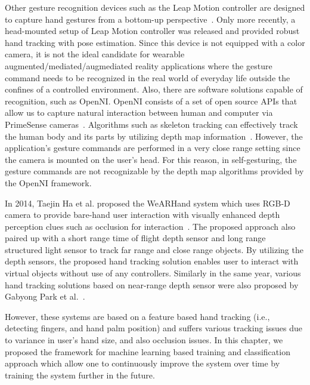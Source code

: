 Other gesture recognition devices such as the Leap Motion controller are
designed to capture hand gestures from a bottom-up perspective~\cite{leapmotion}. Only more recently, a head-mounted setup of Leap Motion controller was released and provided robust hand tracking with pose estimation. Since this device is not equipped with a color camera, it is not the ideal candidate for wearable augmented/mediated/augmediated reality applications where the gesture command needs to be recognized in the real world of everyday life outside the confines of a controlled environment. Also, there are software
solutions capable of recognition, such as OpenNI. OpenNI consists of a set of
open source APIs that allow us to capture natural interaction between human
and computer via PrimeSense cameras~\cite{openniabout}. Algorithms such as
skeleton tracking can effectively track the human body and its parts
by utilizing depth map information~\cite{primesensenite2}. However,
the application's gesture commands are performed in a very close range setting since the camera
is mounted on the user's head. For this reason, in self-gesturing, the gesture commands are not
recognizable by the depth map algorithms provided by the OpenNI framework.

In 2014, Taejin Ha et al. proposed the WeARHand system which uses RGB-D camera to provide bare-hand user interaction with visually enhanced depth perception clues such as occlusion for interaction~\cite{ha2014wearhand}. The proposed approach also paired up with a short range time of flight depth sensor and long range structured light sensor to track far range and close range objects. By utilizing the depth sensors, the proposed hand tracking solution enables user to interact with virtual objects without use of any controllers. Similarly in the same year, various hand tracking solutions based on near-range depth sensor were also proposed by Gabyong Park et al.~\cite{park2014hand}.

However, these systems are based on a feature based hand tracking (i.e., detecting fingers, and hand palm position) and suffers various tracking issues due to variance in user's hand size, and also occlusion issues. In this chapter, we proposed the framework for machine learning based training and classification approach which allow one to continuously improve the system over time by training the system further in the future. 


